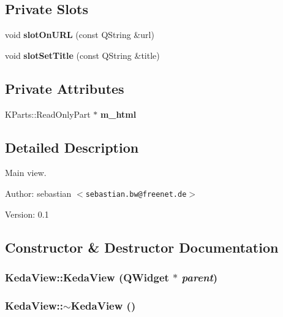 \subsection*{Private Slots}
\begin{CompactItemize}
\item 
void {\bf slot\-On\-URL} (const QString \&url)
\item 
void {\bf slot\-Set\-Title} (const QString \&title)
\end{CompactItemize}
\subsection*{Private Attributes}
\begin{CompactItemize}
\item 
KParts::Read\-Only\-Part $\ast$ {\bf m\_\-html}
\end{CompactItemize}


\subsection{Detailed Description}
Main view. 

\begin{Desc}
\item[Author:]sebastian $<${\tt sebastian.bw@freenet.de}$>$ \end{Desc}
\begin{Desc}
\item[Version:]0.1 \end{Desc}




\subsection{Constructor \& Destructor Documentation}
\subsubsection{\setlength{\rightskip}{0pt plus 5cm}Keda\-View::Keda\-View (QWidget $\ast$ {\em parent})}\label{classKedaView_c8e191ceb74b89413d1f51cae91cdb27}


\subsubsection{\setlength{\rightskip}{0pt plus 5cm}Keda\-View::$\sim$Keda\-View ()\hspace{0.3cm}{\tt  [virtual]}}\label{classKedaView_8b166451d051501d47ad7a73709d784c}




